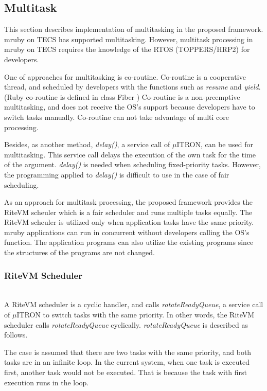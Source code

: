 \documentclass[conference,compsoc]{IEEEtran}
\begin{document}
\subsection{Multitask}
\label{sec:Multitask}
This section describes implementation of multitasking in the proposed framework.
mruby on TECS has supported multitasking.
However, multitask processing in mruby on TECS requires the knowledge of the RTOS (TOPPERS/HRP2) for developers.

One of approaches for multitasking is co-routine.
Co-routine is a cooperative thread, and scheduled by developers with the functions such as {\it resume} and {\it yield}. 
(Ruby co-routine is defined in class Fiber \cite{url:co-routine})
Co-routine is a non-preemptive multitasking, and does not receive the OS's support because developers have to switch tasks manually.
Co-routine can not take advantage of multi core processing.

Besides, as another method, {\it delay()}, a service call of $\mu$ITRON, can be used for multitasking.
This service call delays the execution of the own task for the time of the argument.
{\it delay()} is needed when scheduling fixed-priority tasks.
However, the programming applied to {\it delay()} is difficult to use in the case of fair scheduling.

As an approach for multitask processing, the proposed framework provides the RiteVM scheuler which is a fair scheduler and runs multiple tasks equally.
The RiteVM scheuler is utilized only when application tasks have the same priority.
mruby applications can run in concurrent without developers calling the OS's function.
The application programs can also utilize the existing programs since the structures of the programs are not changed. 

\subsubsection{RiteVM Scheduler} \mbox{}\\

A RiteVM scheduler is a cyclic handler, and calls {\it rotateReadyQueue}, a service call of $\mu$ITRON to switch tasks with the same priority.
In other words, the RiteVM scheduler calls {\it rotateReadyQueue} cyclically.
{\it rotateReadyQueue} is described as follows.

The case is assumed that there are two tasks with the same priority, and both tasks are in an infinite loop.
In the current system, when one task is executed first, another task would not be executed.
That is because the task with first execution runs in the loop.
\end{document}
